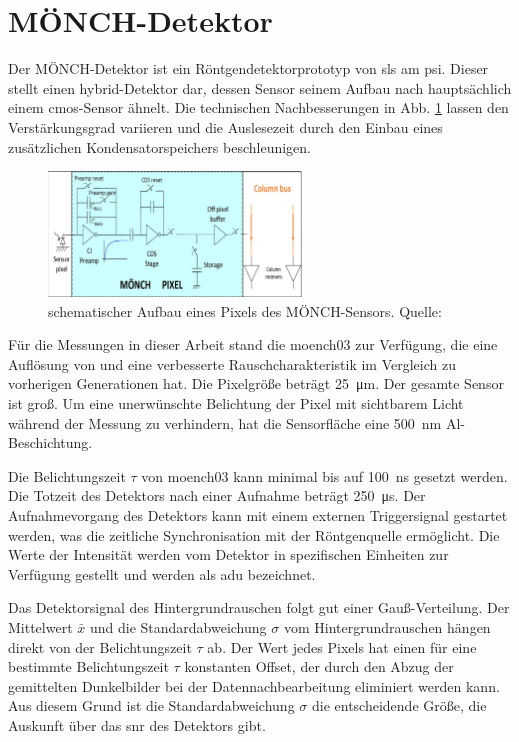 \section{MÖNCH-Detektor}
\label{text:moench_theorie}
Der MÖNCH-Detektor ist ein Röntgendetektorprototyp von \gls{sls} am \gls{psi}. Dieser stellt einen hybrid-Detektor dar, dessen Sensor seinem Aufbau nach hauptsächlich einem \gls{cmos}-Sensor ähnelt. Die technischen Nachbesserungen in Abb. \ref{fig:moench_pixel} lassen den Verstärkungsgrad variieren und die Auslesezeit durch den Einbau eines zusätzlichen Kondensatorspeichers beschleunigen.
\begin{figure}[H]
    \centering
    \includegraphics[width=0.6\textwidth]{images/moench/paper_crop.png}
    \caption{schematischer Aufbau eines Pixels des MÖNCH-Sensors. Quelle: \cite{dinapoli_monch_2014}}
    \label{fig:moench_pixel}
\end{figure}
\noindent
Für die Messungen in dieser Arbeit stand die \gls{moench03} zur Verfügung, die eine Auflösung von  und eine verbesserte Rauschcharakteristik im Vergleich zu vorherigen Generationen hat. Die Pixelgröße beträgt \SI{25}{\micro\meter}. Der gesamte Sensor ist  groß. Um eine unerwünschte Belichtung der Pixel mit sichtbarem Licht während der Messung zu verhindern, hat die Sensorfläche eine \SI{500}{\nano\meter} Al-Beschichtung.

\noindent
Die Belichtungszeit $\tau$ von \gls{moench03} kann minimal bis auf \SI{100}{\nano\second} gesetzt werden. Die Totzeit des Detektors nach einer Aufnahme beträgt \SI{250}{\micro\second}. Der Aufnahmevorgang des Detektors kann mit einem externen Triggersignal gestartet werden, was die zeitliche Synchronisation mit der Röntgenquelle ermöglicht. Die Werte der Intensität werden vom Detektor in spezifischen Einheiten zur Verfügung gestellt und werden als \gls{adu} bezeichnet.

\noindent
Das Detektorsignal des Hintergrundrauschen folgt gut einer Gauß-Verteilung. Der Mittelwert $\bar{x}$ und die Standardabweichung $\sigma$ vom Hintergrundrauschen hängen direkt von der Belichtungszeit $\tau$ ab. Der Wert jedes Pixels hat einen für eine bestimmte Belichtungszeit $\tau$ konstanten Offset, der durch den Abzug der gemittelten Dunkelbilder bei der Datennachbearbeitung eliminiert werden kann. Aus diesem Grund ist die Standardabweichung $\sigma$ die entscheidende Größe, die Auskunft über das \gls{snr} des Detektors gibt.

